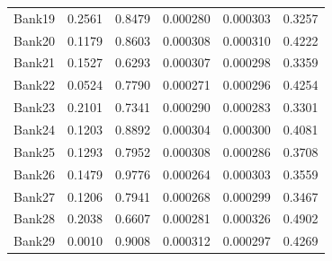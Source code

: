 \begin{longtable}{@{}lrrrrr@{}}
Bank19 & 0.2561 & 0.8479 & 0.000280 & 0.000303 & 0.3257 \\
Bank20 & 0.1179 & 0.8603 & 0.000308 & 0.000310 & 0.4222 \\
Bank21 & 0.1527 & 0.6293 & 0.000307 & 0.000298 & 0.3359 \\
Bank22 & 0.0524 & 0.7790 & 0.000271 & 0.000296 & 0.4254 \\
Bank23 & 0.2101 & 0.7341 & 0.000290 & 0.000283 & 0.3301 \\
Bank24 & 0.1203 & 0.8892 & 0.000304 & 0.000300 & 0.4081 \\
Bank25 & 0.1293 & 0.7952 & 0.000308 & 0.000286 & 0.3708 \\
Bank26 & 0.1479 & 0.9776 & 0.000264 & 0.000303 & 0.3559 \\
Bank27 & 0.1206 & 0.7941 & 0.000268 & 0.000299 & 0.3467 \\
Bank28 & 0.2038 & 0.6607 & 0.000281 & 0.000326 & 0.4902 \\
Bank29 & 0.0010 & 0.9008 & 0.000312 & 0.000297 & 0.4269 \\
\end{longtable}
